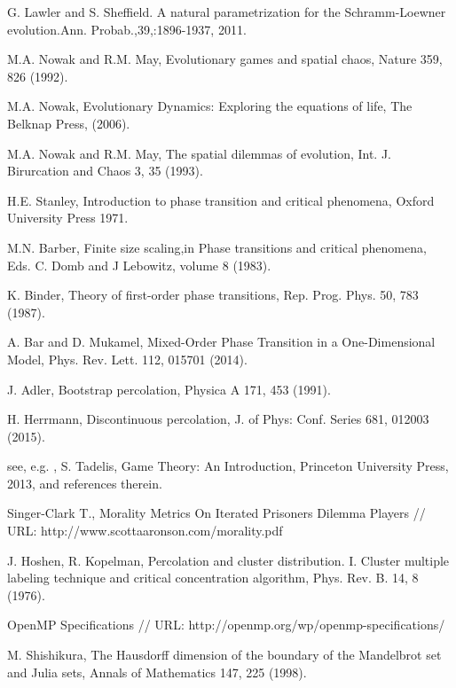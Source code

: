 \documentclass[a4paper]{article}
\begin{document}
\begin{thebibliography}{99}
	G. Lawler and S. Sheffield. A natural parametrization for the Schramm-Loewner evolution.Ann. Probab.,39,:1896-1937, 2011.
	
	  M.A. Nowak and R.M. May, Evolutionary games and spatial chaos, Nature 359, 826 (1992).
	
	  M.A. Nowak, Evolutionary Dynamics:  Exploring the equations of life, The Belknap Press, (2006).
	
	  M.A. Nowak and R.M. May, The spatial dilemmas of evolution, Int. J. Birurcation and Chaos 3, 35 (1993).
	
	  H.E. Stanley, Introduction to phase transition and critical phenomena, Oxford University Press 1971.
	
	  M.N. Barber, Finite size scaling,in Phase transitions and critical phenomena, Eds. C. Domb and J Lebowitz, volume 8 (1983).
	
	  K. Binder, Theory of first-order phase transitions, Rep. Prog. Phys. 50, 783 (1987).
	
	  A. Bar and D. Mukamel, Mixed-Order Phase Transition in a One-Dimensional Model, Phys. Rev. Lett. 112, 015701 (2014).
	
	  J. Adler, Bootstrap percolation, Physica A 171, 453 (1991).
	
	  H. Herrmann, Discontinuous percolation, J. of Phys:  Conf. Series 681, 012003 (2015).
	
	  see, e.g. , S. Tadelis, Game Theory:  An Introduction, Princeton University Press, 2013, and references therein.
	
	 Singer-Clark T., Morality Metrics On Iterated Prisoners Dilemma Players // URL: http://www.scottaaronson.com/morality.pdf
	
	  J.  Hoshen,  R.  Kopelman, Percolation  and  cluster  distribution.  I.  Cluster  multiple  labeling  technique  and critical concentration algorithm, Phys. Rev. B. 14, 8 (1976).
	
	  OpenMP Specifications // URL: http://openmp.org/wp/openmp-specifications/
	
	  M.  Shishikura, The  Hausdorff  dimension  of  the  boundary  of  the  Mandelbrot  set  and  Julia  sets,  Annals  of Mathematics 147, 225 (1998).
	
\end{thebibliography}
\end{document}
